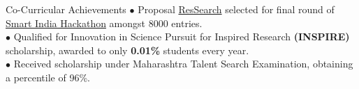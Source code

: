 \documentclass{resume} %
\begin{document}

\begin{rSection}{Co-Curricular Achievements}
$\bullet$ Proposal \href{https://docs.google.com/presentation/d/1ndJbIQCxFEf__I55yOOME-a_UGWDv1KMlukVE2lbDeA/}{ResSearch} selected for final round of \href{https://drive.google.com/open?id=0B5iU6cWw36rOamZLWHZENWdlY0k}{Smart India Hackathon} amongst 8000 entries. \\
$\bullet$ Qualified for Innovation in Science Pursuit for Inspired Research {\bf \large (INSPIRE)} scholarship, awarded to only \textbf{0.01\%} students every year. \\
$\bullet$ Received scholarship under Maharashtra Talent Search Examination, obtaining a percentile of 96\%.
\end{rSection}


\end{document}
